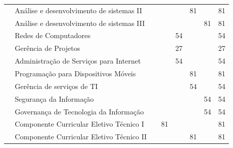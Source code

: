 \documentclass[11pt,fleqn]{book} %
\begin{document}
\begin{table}[]
{\begin{tabular}{|l|l|c|c|c|c|c|c|}
				& Análise e desenvolvimento de sistemas II      &                      &                      &                      & 81                   &                      & 81            \\ \cline{2-8} 
				& Análise e desenvolvimento de sistemas III     &                      &                      &                      &                      & 81                   & 81            \\ \cline{2-8} 
				& Redes de Computadores                         &                      &                      & 54                   &                      &                      & 54            \\ \cline{2-8} 
				& Gerência de Projetos                          &                      &                      & 27                   &                      &                      & 27            \\ \cline{2-8} 
				& Administração de Serviços para Internet       &                      &                      & 54                   &                      &                      & 54            \\ \cline{2-8} 
				& Programação para Dispositivos Móveis          &                      &                      &                      & 81                   &                      & 81            \\ \cline{2-8} 
				& Gerência de serviços de TI                    &                      &                      &                      & 54                   &                      & 54            \\ \cline{2-8} 
				& Segurança da Informação                       &                      &                      &                      &                      & 54                   & 54            \\ \cline{2-8} 
				& Governança de Tecnologia da Informação        &                      &                      &                      &                      & 54                   & 54            \\ \cline{2-8} 
				& Componente Curricular Eletivo Técnico I       &                      & 81                   &                      &                      &                      & 81            \\ \cline{2-8} 
				& Componente Curricular Eletivo Técnico II      &                      &                      &                      & 81                   &                      & 81            \\ \cline{2-8} 

\end{tabular}}
\end{table}
\end{document}
